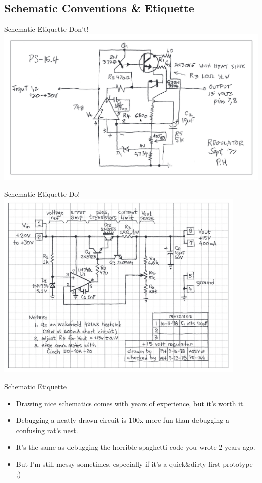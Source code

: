 \documentclass{beamer}
\begin{document}
\subsection{Schematic Conventions \& Etiquette}
\begin{frame}{Schematic Etiquette}
  Don't!\\
  \includegraphics[width=\textwidth]{images/schematic-dont.png} 
\end{frame}

\begin{frame}{Schematic Etiquette}
  Do!\\
  \centering
  \includegraphics[width=0.9\textwidth]{images/schematic-do.png} 
\end{frame}

\begin{frame}{Schematic Etiquette}
  \begin{itemize}
    \item Drawing nice schematics comes with years of experience, but it's worth it.\\
    \item Debugging a neatly drawn circuit is 100x more fun than debugging a confusing rat's nest.\\
    \pause
    \item It's the same as debugging the horrible spaghetti code you wrote 2 years ago.
    \pause
    \item But I'm still messy sometimes, especially if it's a quick\&dirty first prototype ;)
  \end{itemize}
\end{frame}
\end{document}
